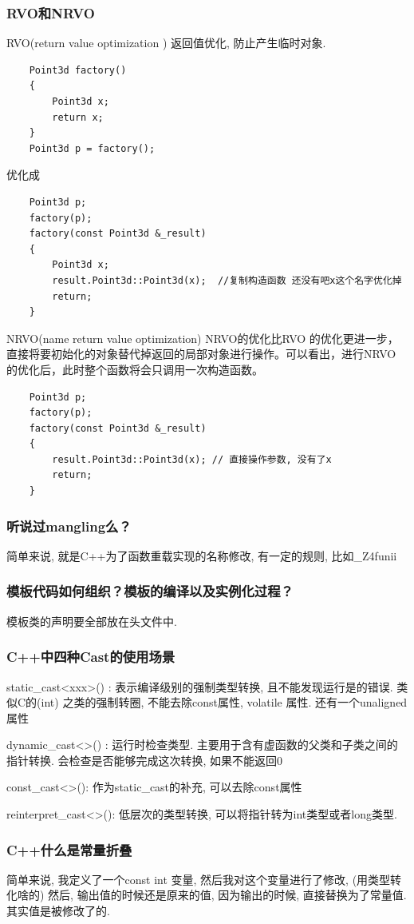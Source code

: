 \documentclass[UTF8]{ctexart}
\begin{document}
\subsubsection{RVO和NRVO}
RVO(return value optimization ) 返回值优化, 防止产生临时对象. \par
\begin{lstlisting}
	Point3d factory()
	{
		Point3d x;
		return x;
	}
	Point3d p = factory();
\end{lstlisting}
优化成
\begin{lstlisting}
	Point3d p;
	factory(p);
	factory(const Point3d &_result)
	{
		Point3d x;
		result.Point3d::Point3d(x);  //复制构造函数 还没有吧x这个名字优化掉
		return;
	}
\end{lstlisting}
NRVO(name return value optimization) NRVO的优化比RVO 的优化更进一步，直接将要初始化的对象替代掉返回的局部对象进行操作。可以看出，进行NRVO 的优化后，此时整个函数将会只调用一次构造函数。
\begin{lstlisting}
	Point3d p;
	factory(p);
	factory(const Point3d &_result)
	{
		result.Point3d::Point3d(x); // 直接操作参数, 没有了x
		return;
	}
\end{lstlisting}
\subsubsection{听说过mangling么？}
简单来说, 就是C++为了函数重载实现的名称修改, 有一定的规则, 比如\_Z4funii \par
\subsubsection{模板代码如何组织？模板的编译以及实例化过程？}
模板类的声明要全部放在头文件中.
\subsubsection{C++中四种Cast的使用场景}
static\_cast<xxx>() : 表示编译级别的强制类型转换, 且不能发现运行是的错误. 类似C的(int) 之类的强制转圈, 不能去除const属性, volatile 属性. 还有一个unaligned属性 \par
dynamic\_cast<>() : 运行时检查类型. 主要用于含有虚函数的父类和子类之间的指针转换. 会检查是否能够完成这次转换, 如果不能返回0 \par
const\_cast<>(): 作为static\_cast的补充, 可以去除const属性 \par
reinterpret\_cast<>(): 低层次的类型转换, 可以将指针转为int类型或者long类型. \par
\subsubsection{C++什么是常量折叠}
简单来说, 我定义了一个const int 变量, 然后我对这个变量进行了修改, (用类型转化啥的) 然后, 输出值的时候还是原来的值, 因为输出的时候, 直接替换为了常量值. 其实值是被修改了的.
\end{document}
